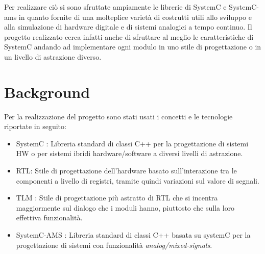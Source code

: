 \documentclass[]{IEEEtran}
\begin{document}
Per realizzare ciò si sono sfruttate ampiamente  le librerie di SystemC e SystemC-ams in quanto fornite di una molteplice varietà di costrutti utili allo sviluppo e alla simulazione di hardware digitale e di sistemi analogici a tempo continuo. Il progetto realizzato cerca infatti anche di sfruttare al meglio le caratteristiche di SystemC andando ad implementare ogni modulo in uno stile di progettazione o in un livello di astrazione diverso.

\section{Background}

Per la realizzazione del progetto sono stati usati i concetti e le tecnologie riportate in seguito:
\begin{itemize}
	\item SystemC \cite{SystemC}: Libreria standard di classi C++ per la progettazione di sistemi HW o per sistemi ibridi hardware/software a diversi livelli di astrazione.
	\item RTL: Stile di progettazione dell'hardware basato sull'interazione tra le componenti a livello di registri, tramite quindi variazioni sul valore di segnali.
	\item TLM \cite{TLM}: Stile di progettazione più astratto di RTL che si incentra maggiormente sul dialogo che i moduli hanno, piuttosto che sulla loro effettiva funzionalità.
	\item SystemC-AMS \cite{AMS}: Libreria standard di classi C++ basata su systemC per la progettazione di sistemi con funzionalità \emph{analog/mixed-signals}.
	

\end{itemize}
\end{document}
